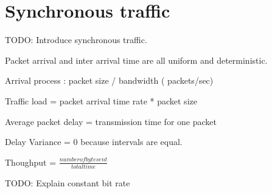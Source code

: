 \section{Synchronous traffic}

TODO: Introduce synchronous traffic.

Packet arrival and inter arrival time are all uniform and deterministic.

\begin{description}
    \item Arrival process : packet size / bandwidth ( packets/sec)
    \item Traffic load = packet arrival time rate * packet size
    \item Average packet delay = transmission time for one packet
    \item Delay Variance = 0 because intervals are equal.
    \item Thoughput = $\frac{number of byte sent}{total time}$
\end{description}

TODO: Explain constant bit rate

